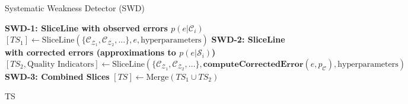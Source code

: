 \IncMargin{1em}
\begin{algorithm}[H]
\caption{Systematic Weakness Detector (SWD)}\label{algo:combined_sliceline}

\textbf{SWD-1: SliceLine with observed errors $p(e|\mathcal{C}_i)$}\;
\Indp
    $[TS_1] \gets \text{SliceLine}(\{\mathcal{C}_{\mathcal Z_1}, \mathcal{C}_{\mathcal Z_2}, \dots \}, e, \text{hyperparameters})$\; 
\Indm  
\textbf{SWD-2: SliceLine with corrected errors (approximations to $p(e|\mathcal{S}_i)$)}\;
\Indp
 $[TS_2, \text{Quality Indicators}] \gets \text{SliceLine}(\{\mathcal{C}_{\mathcal Z_1}, \mathcal{C}_{\mathcal Z_2}, \dots\}, \textbf{computeCorrectedError}(e, p_{\mathcal{C}}) , \text{hyperparameters})$\;
\Indm  
\textbf{SWD-3: Combined Slices}\;
\Indp
    $[TS] \gets \text{Merge}(TS_1 \cup TS_2)$\; 
\Indm

\Return TS\;
\end{algorithm}
\DecMargin{1em}

